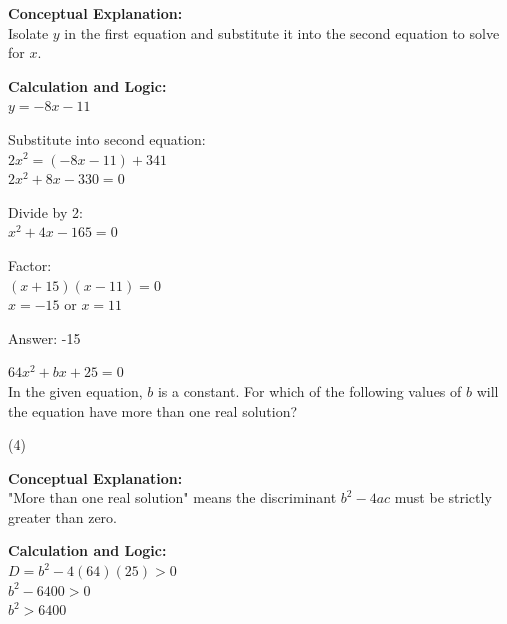 \documentclass[11pt,paper=a4,answers]{exam}
\begin{document}
\begin{questions}
\begin{solution}
\textbf{Conceptual Explanation:} \\
Isolate $y$ in the first equation and substitute it into the second equation to solve for $x$.

\vspace{20pt}

\textbf{Calculation and Logic:} \\
$y = -8x - 11$

\vspace{10pt}

Substitute into second equation: \\
$2x^2 = (-8x - 11) + 341$ \\
$2x^2 + 8x - 330 = 0$

\vspace{10pt}

Divide by 2: \\
$x^2 + 4x - 165 = 0$

\vspace{10pt}

Factor: \\
$(x + 15)(x - 11) = 0$ \\
$x = -15$ or $x = 11$

\vspace{25pt}

Answer: \colorbox{yellow!100}{-15}
\end{solution}

\vspace{40pt}

\question
$64x^2 + bx + 25 = 0$ \\
In the given equation, $b$ is a constant. For which of the following values of $b$ will the equation have more than one real solution?
\begin{tasks}(4)
\end{tasks}

\begin{solution}
\textbf{Conceptual Explanation:} \\
"More than one real solution" means the discriminant $b^2 - 4ac$ must be strictly greater than zero.

\vspace{20pt}

\textbf{Calculation and Logic:} \\
$D = b^2 - 4(64)(25) > 0$ \\
$b^2 - 6400 > 0$ \\
$b^2 > 6400$


\end{solution}
\end{questions}
\end{document}
